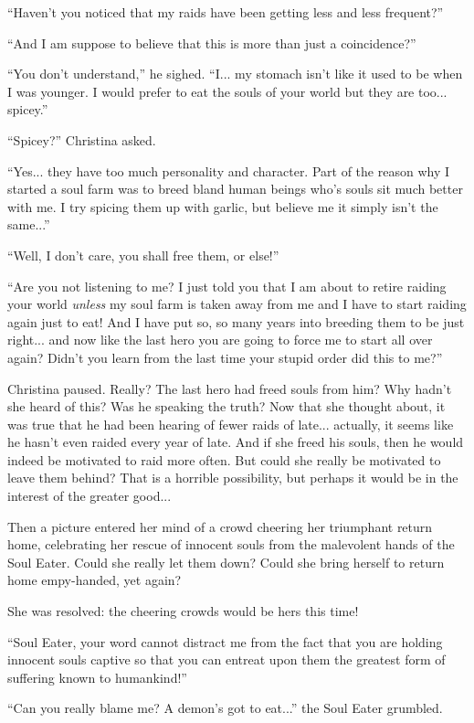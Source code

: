 \documentclass[showtrims,b6paper,draft,10pt]{memoir}
\begin{document}
``Haven't you noticed that my raids have been getting less and less frequent?''

``And I am suppose to believe that this is more than just a coincidence?''

``You don't understand,'' he sighed.   ``I... my stomach isn't like it used to be when I was younger.  I would prefer to eat the souls of your world but they are too... spicey.''

``Spicey?''  Christina asked.

``Yes... they have too much personality and character.  Part of the reason why I started a soul farm was to breed bland human beings who's souls sit much better with me.  I try spicing them up with garlic, but believe me it simply isn't the same...''

``Well, I don't care, you shall free them, or else!''

``Are you not listening to me?  I just told you that I am about to retire raiding your world \emph{unless} my soul farm is taken away from me and I have to start raiding again just to eat!  And I have put so, so many years into breeding them to be just right...  and now like the last hero you are going to force me to start all over again?  Didn't you learn from the last time your stupid order did this to me?''

Christina paused.  Really?  The last hero had freed souls from him?  Why hadn't she heard of this?  Was he speaking the truth?  Now that she thought about, it was true that he had been hearing of fewer raids of late... actually, it seems like he hasn't even raided every year of late.  And if she freed his souls, then he would indeed be motivated to raid more often.  But could she really be motivated to leave them behind?  That is a horrible possibility, but perhaps it would be in the interest of the greater good...

Then a picture entered her mind of a crowd cheering her triumphant return home, celebrating her rescue of innocent souls from the malevolent hands of the Soul Eater.  Could she really let them down?  Could she bring herself to return home empy-handed, yet again?

She was resolved:  the cheering crowds would be hers this time!

``Soul Eater, your word cannot distract me from the fact that you are holding innocent souls captive so that you can entreat upon them the greatest form of suffering known to humankind!''

``Can you really blame me?  A demon's got to eat...'' the Soul Eater grumbled.
\end{document}
